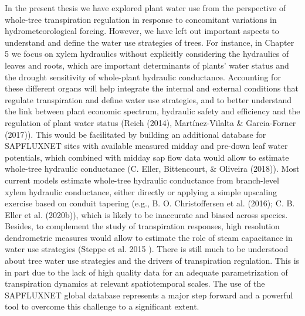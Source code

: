 \documentclass[11pt,twoside]{reedthesis}
\begin{document}
In the present thesis we have explored plant water use from the
perspective of whole-tree transpiration regulation in response to
concomitant variations in hydrometeorological forcing. However, we have
left out important aspects to understand and define the water use
strategies of trees. For instance, in Chapter 5 we focus on xylem
hydraulics without explicitly considering the hydraulics of leaves and
roots, which are important determinants of plants' water status and the
drought sensitivity of whole-plant hydraulic conductance. Accounting for
these different organs will help integrate the internal and external
conditions that regulate transpiration and define water use strategies,
and to better understand the link between plant economic spectrum,
hydraulic safety and efficiency and the regulation of plant water status
(Reich (2014), Martínez-Vilalta \& Garcia-Forner (2017)). This would be
facilitated by building an additional database for SAPFLUXNET sites with
available measured midday and pre-down leaf water potentials, which
combined with midday sap flow data would allow to estimate whole-tree
hydraulic conductance (C. Eller, Bittencourt, \& Oliveira (2018)). Most
current models estimate whole-tree hydraulic conductance from
branch-level xylem hydraulic conductance, either directly or applying a
simple upscaling exercise based on conduit tapering (e.g., B. O.
Christoffersen et al. (2016); C. B. Eller et al. (2020b)), which is
likely to be inaccurate and biased across species. Besides, to
complement the study of transpiration responses, high resolution
dendrometric measures would allow to estimate the role of steam
capacitance in water use strategies (Steppe et al. 2015 ). There is
still much to be understood about tree water use strategies and the
drivers of transpiration regulation. This is in part due to the lack of
high quality data for an adequate parametrization of transpiration
dynamics at relevant spatiotemporal scales. The use of the SAPFLUXNET
global database represents a major step forward and a powerful tool to
overcome this challenge to a significant extent.\par
\newpage
\end{document}
